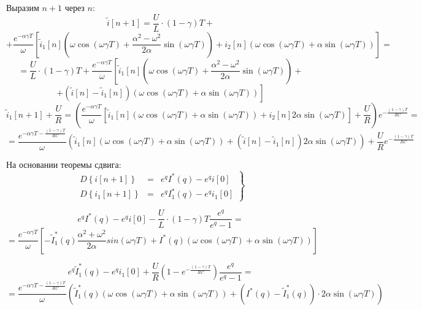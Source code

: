 \documentclass[a4paper,12pt]{article}
\begin{document}
Выразим $n+1$ через $n$:
$$
\tilde{i}[n+1] = \frac{U}{L}\cdot (1-\gamma)T +
$$
$$
+ \frac{e^{-\alpha\gamma T}}{\omega}
\left[
\tilde{i}_1[n] \left(\omega\cos(\omega\gamma T) + \frac{\alpha^2 - \omega^2}{2\alpha}\sin(\omega\gamma T) \right)
+ i_2[n]\left(\omega\cos(\omega\gamma T)  + \alpha\sin(\omega\gamma T)\right)
\right] =
$$ 
$$
= \frac{U}{L}\cdot (1-\gamma)T + \frac{e^{-\alpha\gamma T}}{\omega}
\left[
\tilde{i}_1[n]\left(\omega\cos(\omega\gamma T) + \frac{\alpha^2 - \omega^2}{2\alpha}\sin(\omega\gamma T) \right) \right. +
$$
$$
\left.
+ \left(\tilde{i}[n] - \tilde{i}_1[n]\right)\left(\omega\cos(\omega\gamma T)
+ \alpha\sin(\omega\gamma T)\right)
\right]
$$
$$
\tilde{i}_1[n+1] +\frac{U}{R} = \left(\frac{e^{-\alpha\gamma T}}{\omega} 
\left[ \tilde{i}_1[n] 
\left(\omega\cos(\omega\gamma T) + \alpha \sin(\omega\gamma T)\right)
+ i_2[n] 2\alpha\sin(\omega\gamma T) \right] + \frac{U}{R}\right) e^{-\frac{(1-\gamma)T}{RC}} =
$$ 
$$
= \frac{e^{-\alpha\gamma T -\frac{(1-\gamma)T}{RC}}}{\omega} \left( \tilde{i}_1[n] 
\left(\omega\cos(\omega\gamma T) + \alpha \sin(\omega\gamma T)\right)
+ \left(\tilde{i}[n] - \tilde{i}_1[n]\right)2\alpha\sin(\omega\gamma T) \right)
+ \frac{U}{R} e^{-\frac{(1-\gamma)T}{RC}}
$$

На основании теоремы сдвига:
$$
\left.
\begin{array}{lcl}
D\left\{i[n+1]\right\} &=& e^q I^*(q) - e^q i[0]\\[1.5mm]
D\left\{i_1[n+1]\right\} &=& e^q I_1^*(q) - e^q i_1[0]
\end{array}
\right\}
$$

$$
e^q I^*(q) - e^qi[0] - \frac{U}{L}\cdot(1-\gamma)T\frac{e^q}{e^q - 1} = 
$$
$$
= \frac{e^{-\alpha\gamma T}}{\omega} \left[
-\tilde{I}_1^*(q) \frac{\alpha^2+\omega^2}{2\alpha} sin(\omega\gamma T) 
+ I^*(q) \left(\omega\cos(\omega\gamma T) + \alpha\sin(\omega\gamma T)\right)
\right]
$$

$$
e^q\tilde{I}^*_1(q) - e^q i_1[0] + 
\frac{U}{R}\left(1- e^{-\frac{(1-\gamma)T}{RC}} \right) \frac{e^q}{e^q-1} =
$$
$$
= \frac{e^{-\alpha\gamma T - \frac{(1-\gamma)T}{RC}}}{\omega} \left(
\tilde{I}_1^*(q) \left(\omega\cos(\omega\gamma T) + \alpha\sin(\omega\gamma T)\right)
+ \left(I^*(q) - \tilde{I}^*_1(q) \right)\cdot 2\alpha\sin(\omega\gamma T)
\right)
$$
\end{document}
